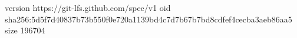 version https://git-lfs.github.com/spec/v1
oid sha256:5d5f7d40837b73b550f0e720a1139bd4c7d7b67b7bd8cdfef4cecba3aeb86aa5
size 196704
